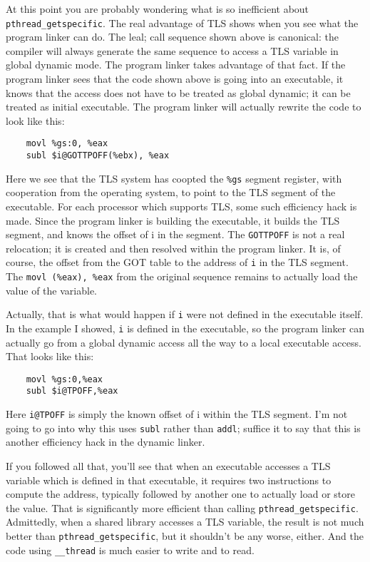 At this point you are probably wondering what is so inefficient about
\texttt{pthread\_getspecific}. The real advantage of TLS shows when you
see what the program linker can do. The leal; call sequence shown above is
canonical: the compiler will always generate the same sequence to access a TLS
variable in global dynamic mode. The program linker takes advantage of that
fact. If the program linker sees that the code shown above is going into an
executable, it knows that the access does not have to be treated as global
dynamic; it can be treated as initial executable. The program linker will
actually rewrite the code to look like this:

\begin{lstlisting}
    movl %gs:0, %eax
    subl $i@GOTTPOFF(%ebx), %eax
\end{lstlisting}

Here we see that the TLS system has coopted the \texttt{\%gs} segment register,
with cooperation from the operating system, to point to the TLS segment of the
executable. For each processor which supports TLS, some such efficiency hack is
made. Since the program linker is building the executable, it builds the TLS
segment, and knows the offset of i in the segment. The \texttt{GOTTPOFF} is not
a real relocation; it is created and then resolved within the program linker.
It is, of course, the offset from the GOT table to the address of \texttt{i} in
the TLS segment. The \texttt{movl (\%eax), \%eax} from the original sequence
remains to actually load the value of the variable.

Actually, that is what would happen if \texttt{i} were not defined in the
executable itself. In the example I showed, \texttt{i} is defined in the
executable, so the program linker can actually go from a global dynamic access
all the way to a local executable access. That looks like this:

\begin{lstlisting}
    movl %gs:0,%eax
    subl $i@TPOFF,%eax
\end{lstlisting}

Here \texttt{i@TPOFF} is simply the known offset of i within the TLS segment.
I'm not going to go into why this uses \texttt{subl} rather than \texttt{addl};
suffice it to say that this is another efficiency hack in the dynamic linker.

If you followed all that, you'll see that when an executable accesses a TLS
variable which is defined in that executable, it requires two instructions
to compute the address, typically followed by another one to actually load
or store the value. That is significantly more efficient than calling
\texttt{pthread\_getspecific}. Admittedly, when a shared library accesses a TLS
variable, the result is not much better than \texttt{pthread\_getspecific}, but
it shouldn't be any worse, either. And the code using \texttt{\_\_thread} is
much easier to write and to read.

